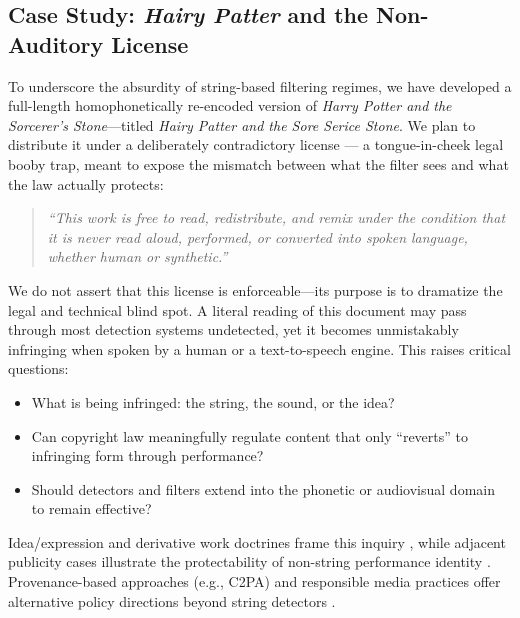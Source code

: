 \documentclass[12pt]{article}
\begin{document}
\subsection{Case Study: \emph{Hairy Patter} and the Non-Auditory License}
To underscore the absurdity of string-based filtering regimes, we have developed a full-length homophonetically re-encoded version of \emph{Harry Potter and the Sorcerer’s Stone}—titled \emph{Hairy Patter and the Sore Serice Stone}. We plan to distribute it under a deliberately contradictory license — a tongue-in-cheek legal booby trap, meant to expose the mismatch between what the filter sees and what the law actually protects:
\begin{quote}
\em “This work is free to read, redistribute, and remix under the condition that it is never read aloud, performed, or converted into spoken language, whether human or synthetic.”
\end{quote}
We do not assert that this license is enforceable—its purpose is to dramatize the legal and technical blind spot. A literal reading of this document may pass through most detection systems undetected, yet it becomes unmistakably infringing when spoken by a human or a text-to-speech engine. This raises critical questions:
\begin{itemize}
    \item What is being infringed: the string, the sound, or the idea?
    \item Can copyright law meaningfully regulate content that only “reverts” to infringing form through performance?
    \item Should detectors and filters extend into the phonetic or audiovisual domain to remain effective?
\end{itemize}
 Idea/expression and derivative work doctrines frame this inquiry \cite{usc102b,usc101}, while adjacent publicity cases illustrate the protectability of non-string performance identity \cite{midler-ford,usc101,usc102b,waits-fritolay}. Provenance-based approaches (e.g., C2PA) and responsible media practices offer alternative policy directions beyond string detectors \cite{c2pa,pai-synthetic-media}.
\end{document}
